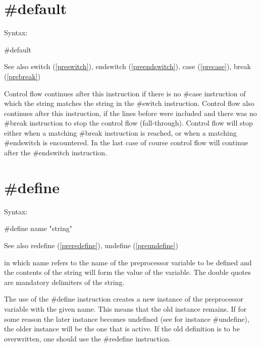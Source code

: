 
\section{\#default}
\label{predefault}

\noindent Syntax:

\#default
 
\noindent See also switch (\ref{preswitch}),
        endswitch (\ref{preendswitch}),
        case (\ref{precase}),
        break (\ref{prebreak})

\noindent Control flow continues after this instruction if 
there is no \#case instruction of which the string matches 
the string in the \#switch instruction. Control flow also 
continues after this instruction, if the lines before were included and 
there was no \#break instruction to stop the control flow 
(fall-through). Control flow will stop either when a matching \#break 
instruction is reached, or when a matching \#endswitch 
is encountered. In the last case of course control flow will continue after 
the \#endswitch instruction.


\section{\#define}
\label{predefine}

\noindent Syntax:

\#define name "string"
 
\noindent See also redefine (\ref{preredefine}), undefine 
(\ref{preundefine})

\noindent in which name refers to the name of the 
preprocessor 
variable to be defined and the contents of the 
string will form the value of the variable. The double quotes are mandatory 
delimiters of the string.

The use of the \#define instruction creates a new instance 
of the preprocessor variable with the given name. This means that the old 
instance remains. If for some reason the later instance 
becomes undefined (see for instance \#undefine), the older instance will be 
the one that is active. If the old definition is to be overwritten, one 
should use the \#redefine instruction.

